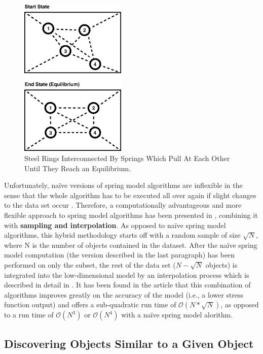 \begin{figure}[H]
  \centering
    \includegraphics[width=0.45\textwidth]{figures/spring_model}
  \caption{Steel Rings Interconnected By Springs Which Pull At Each Other Until They Reach an Equilibrium.}
  \label{fig:spring_model}
\end{figure}

Unfortunately, naïve versions of spring model algorithms are inflexible in the sense that the whole algorithm has to be executed all over again if slight changes to the data set occur \cite{Morrison:2003:FMS}. Therefore, a computationally advantageous and more flexible approach to spring model algorithms has been presented in \cite{Morrison:2003:FMS}, combining it with \textbf{sampling and interpolation}. As opposed to naïve spring model algorithms, this hybrid methodology starts off with a random sample of size $\sqrt{N}$, where N is the number of objects contained in the dataset. After the naïve spring model computation (the version described in the last paragraph) has been performed on only the subset, the rest of the data set ($N - \sqrt{N}$ objects) is integrated into the low-dimensional model by an interpolation process which is described in detail in \cite{Morrison:2003:FMS}. It has been found in the article that this combination of algorithms improves greatly on the accuracy of the model (i.e., a lower stress function output) and offers a sub-quadratic run time of $\mathcal O(N*\sqrt{N})$, as opposed to a run time of $\mathcal O(N^3)$ or $\mathcal O(N^4)$ with a naïve spring model alorithm.

\subsection{Discovering Objects Similar to a Given Object}

